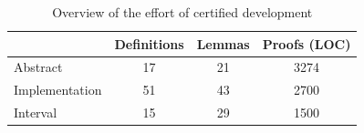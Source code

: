 \begin{table}[h]
  \centering
  \small
  \begin{tabular}{lccc}
      \toprule
      & \textbf{Definitions} & \textbf{Lemmas} & \textbf{Proofs (LOC)} \\
      \midrule
      Abstract & 17 & 21 & 3274 \\
      Implementation & 51 & 43 & 2700 \\
      Interval & 15 & 29 & 1500 \\
      \bottomrule
  \end{tabular}
  \caption{Overview of the effort of certified development}
  \label{tab:abstract_impl}
\end{table}
